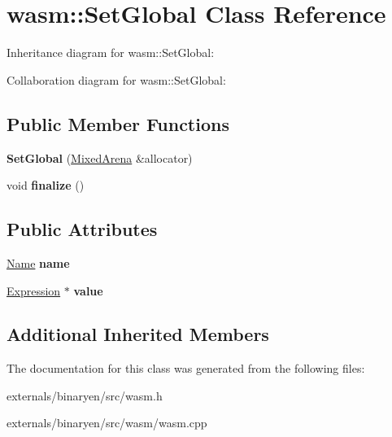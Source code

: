\hypertarget{classwasm_1_1_set_global}{}\section{wasm\+:\+:Set\+Global Class Reference}
\label{classwasm_1_1_set_global}


Inheritance diagram for wasm\+:\+:Set\+Global\+:


Collaboration diagram for wasm\+:\+:Set\+Global\+:
\subsection*{Public Member Functions}
\begin{DoxyCompactItemize}
\item 
\mbox{\label{classwasm_1_1_set_global_a8e39dc1d258e369f81f93969a6f7afb8}} 
{\bfseries Set\+Global} (\mbox{\hyperlink{struct_mixed_arena}{Mixed\+Arena}} \&allocator)
\item 
\mbox{\label{classwasm_1_1_set_global_a6e2cc4f7453f1e8b9d5149391f4b8d15}} 
void {\bfseries finalize} ()
\end{DoxyCompactItemize}
\subsection*{Public Attributes}
\begin{DoxyCompactItemize}
\item 
\mbox{\label{classwasm_1_1_set_global_a910252c4fd4a36faee3dac0fc7de8447}} 
\mbox{\hyperlink{structwasm_1_1_name}{Name}} {\bfseries name}
\item 
\mbox{\label{classwasm_1_1_set_global_afec30c787021aee3095736a50cd5f6cb}} 
\mbox{\hyperlink{classwasm_1_1_expression}{Expression}} $\ast$ {\bfseries value}
\end{DoxyCompactItemize}
\subsection*{Additional Inherited Members}


The documentation for this class was generated from the following files\+:\begin{DoxyCompactItemize}
\item 
externals/binaryen/src/wasm.\+h\item 
externals/binaryen/src/wasm/wasm.\+cpp\end{DoxyCompactItemize}
